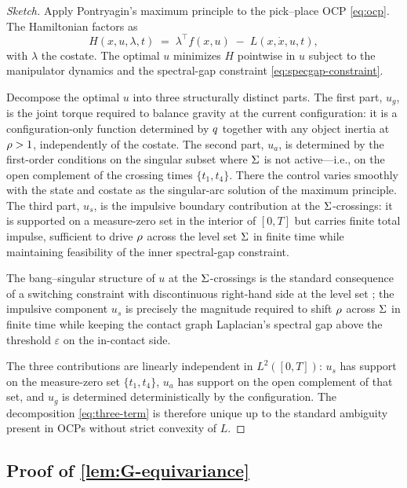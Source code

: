 \begin{proof}[Sketch]
Apply Pontryagin's maximum principle \citep{Pontryagin1962} to
the pick--place OCP \eqref{eq:ocp}. The Hamiltonian factors as
\[
  H(x, u, \lambda, t)
  \;=\; \lambda^{\top} f(x, u) \;-\; L(x, \dot x, u, t),
\]
with $\lambda$ the costate. The optimal $u$ minimizes $H$
pointwise in $u$ subject to the manipulator dynamics and the
spectral-gap constraint \eqref{eq:specgap-constraint}.

Decompose the optimal $u$ into three structurally distinct
parts. The first part, $u_{g}$, is the joint torque required to
balance gravity at the current configuration: it is a
configuration-only function determined by $q$ together
with any object inertia at $\rho > 1$, independently of the
costate. The second part, $u_{a}$, is determined by the
first-order conditions on the singular subset where $\Sigma$
is not active---i.e., on the open complement of the crossing
times $\{t_{1}, t_{4}\}$. There the control varies smoothly with
the state and costate as the singular-arc solution of the
maximum principle. The third part, $u_{s}$, is the impulsive
boundary contribution at the $\Sigma$-crossings: it is
supported on a measure-zero set in the interior of $[0, T]$ but
carries finite total impulse, sufficient to drive $\rho$
across the level set $\Sigma$ in finite time while maintaining
feasibility of the inner spectral-gap constraint.

The bang--singular structure of $u$ at the $\Sigma$-crossings
is the standard consequence of a switching constraint with
discontinuous right-hand side at the level set
\citep{BrysonHo1975}; the impulsive component $u_{s}$ is
precisely the magnitude required to shift $\rho$ across
$\Sigma$ in finite time while keeping the contact graph
Laplacian's spectral gap above the threshold $\varepsilon$ on
the in-contact side.

The three contributions are linearly independent in
$L^{2}([0, T])$: $u_{s}$ has support on the measure-zero set
$\{t_{1}, t_{4}\}$, $u_{a}$ has support on the open complement
of that set, and $u_{g}$ is determined deterministically by the
configuration. The decomposition \eqref{eq:three-term} is
therefore unique up to the standard ambiguity present in OCPs
without strict convexity of $L$.
\end{proof}

\subsection{Proof of \cref{lem:G-equivariance}}
\label{app:proof:G-equivariance}

